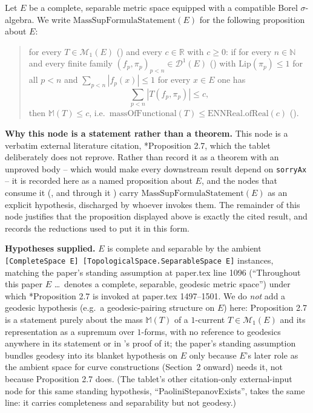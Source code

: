 \begin{definition}
  Let $E$ be a complete, separable metric space equipped with a compatible Borel $\sigma$-algebra.
  We write $\mathrm{MassSupFormulaStatement}(E)$ for the following proposition about $E$:
  \begin{quote}
    for every $T \in \mathcal{M}_1(E)$ () and every $c \in \mathbb{R}$
    with $c \ge 0$: if for every $n \in \mathbb{N}$ and every finite family $(f_p,\pi_p)_{p<n}
    \in \mathcal{D}^1(E)$ () with $\mathrm{Lip}(\pi_p) \le 1$ for all $p<n$ and
    $\sum_{p<n} |f_p(x)| \le 1$ for every $x \in E$ one has
    \[
      \sum_{p<n} |T(f_p,\pi_p)| \le c
      ,
    \]
    then $\mathbb{M}(T) \le c$, i.e.\ $\mathrm{massOfFunctional}(T) \le
    \mathrm{ENNReal.ofReal}(c)$ ().
  \end{quote}

  \textbf{Why this node is a statement rather than a theorem.} This node is a verbatim external
  literature citation, \cite{AmbrosioKirchheim}*{Proposition 2.7}, which the tablet deliberately
  does not reprove. Rather than record it as a theorem with an unproved body -- which would make
  every downstream result depend on \texttt{sorryAx} -- it is recorded here as a named proposition
  about $E$, and the nodes that consume it (, and through it
  ) carry $\mathrm{MassSupFormulaStatement}(E)$ as an explicit
  hypothesis, discharged by whoever invokes them. The remainder of this node justifies that the
  proposition displayed above is exactly the cited result, and records the reductions used to put
  it in this form.

  \textbf{Hypotheses supplied.} $E$ is complete and separable by the ambient
  \texttt{[CompleteSpace E] [TopologicalSpace.SeparableSpace E]} instances, matching the paper's
  standing assumption at paper.tex line 1096 (``Throughout this paper $E$ \dots\ denotes a
  complete, separable, geodesic metric space'') under which \cite{AmbrosioKirchheim}*{Proposition
  2.7} is invoked at paper.tex 1497--1501. We do \emph{not} add a geodesic hypothesis (e.g.\ a
  geodesic-pairing structure on $E$) here: Proposition 2.7 is a statement purely about the mass
  $\mathbb{M}(T)$ of a $1$-current $T \in \mathcal{M}_1(E)$ and its representation as a supremum
  over $1$-forms, with no reference to geodesics anywhere in its statement or in
  \cite{AmbrosioKirchheim}'s proof of it; the paper's standing assumption bundles geodesy into its
  blanket hypothesis on $E$ only because $E$'s later role as the ambient space for curve
  constructions (Section~2 onward) needs it, not because Proposition 2.7 does. (The tablet's other
  citation-only external-input node for this same standing hypothesis, ``PaoliniStepanovExists'',
  takes the same line: it carries completeness and separability but not geodesy.)


\end{definition}
